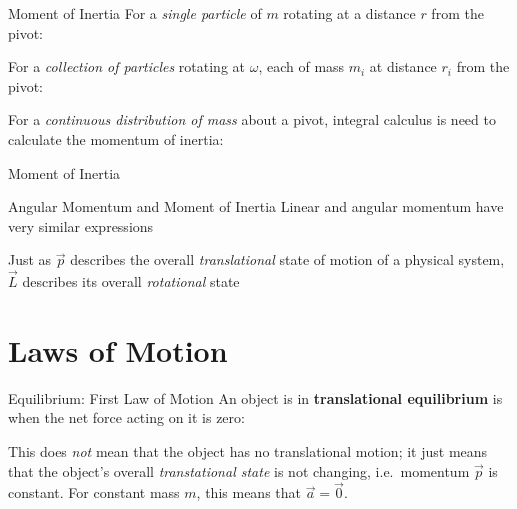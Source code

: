 \documentclass[12pt,compress,aspectratio=169]{beamer}
\begin{document}
\begin{frame}{Moment of Inertia}
  For a \emph{single particle} of $m$ rotating at a distance $r$ from the pivot:
  

  For a \emph{collection of particles} rotating at $\omega$, each of mass
  $m_i$ at distance $r_i$ from the pivot:


  For a \emph{continuous distribution of mass} about a pivot, integral calculus
  is need to calculate the momentum of inertia:

\end{frame}



\begin{frame}{Moment of Inertia}
  \centering
\end{frame}



\begin{frame}{Angular Momentum and Moment of Inertia}
  Linear and angular momentum have very similar expressions
    
  \vspace{-.4in}{\Large
    \begin{align*}
      \vec p&=m\vec v\\
      \vec L&=I\vec\omega
    \end{align*}
  }
  
  \vspace{-.25in}Just as $\vec p$ describes the overall \emph{translational}
  state of motion of a physical system, $\vec L$ describes its overall
  \emph{rotational} state
\end{frame}



\section{Laws of Motion}

\begin{frame}{Equilibrium: First Law of Motion}
  An object is in \textbf{translational equilibrium} is when the net force
  acting on it is zero:
  

  This does \emph{not} mean that the object has no translational motion; it
  just means that the object's overall \emph{transtational state} is not
  changing, i.e.\ momentum $\vec p$ is constant. For constant mass $m$,
  this means that $\vec a=\vec 0$.
\end{frame}
\end{document}
